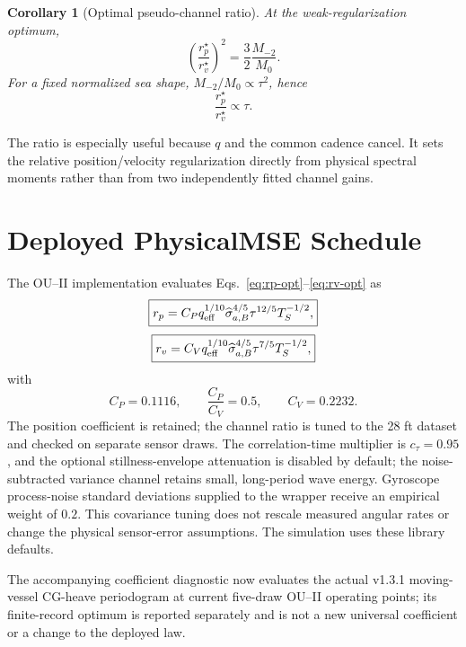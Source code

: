 \documentclass[conference]{IEEEtran}
\newtheorem{corollary}{Corollary}
\begin{document}
\begin{corollary}[Optimal pseudo-channel ratio]
At the weak-regularization optimum,
\begin{equation}
 \boxed{
 \left(\frac{r_p^\star}{r_v^\star}\right)^2
 =\frac{3}{2}\frac{M_{-2}}{M_0}.}
 \label{eq:ratio-exact}
\end{equation}
For a fixed normalized sea shape,
$M_{-2}/M_0\propto\tau^2$, hence
\begin{equation}
 \boxed{\frac{r_p^\star}{r_v^\star}\propto\tau.}
 \label{eq:ratio-tau}
\end{equation}
\end{corollary}

The ratio is especially useful because $q$ and the common cadence cancel. It
sets the relative position/velocity regularization directly from physical
spectral moments rather than from two independently fitted channel gains.

\section{Deployed PhysicalMSE Schedule}
\label{sec:deployed}

The OU--II implementation evaluates Eqs.~\eqref{eq:rp-opt}--\eqref{eq:rv-opt}
as
\begin{equation}
 \boxed{
 r_p=
 C_P q_{\rm eff}^{1/10}\widehat\sigma_{a,B}^{4/5}
 \tau^{12/5}T_S^{-1/2},}
 \label{eq:deployed-rp}
\end{equation}
\begin{equation}
 \boxed{
 r_v=
 C_V q_{\rm eff}^{1/10}\widehat\sigma_{a,B}^{4/5}
 \tau^{7/5}T_S^{-1/2},}
 \label{eq:deployed-rv}
\end{equation}
with
\begin{equation}
 C_P=0.1116,
 \qquad
 \frac{C_P}{C_V}=0.5,
 \qquad C_V=0.2232.
 \label{eq:deployed-constants}
\end{equation}
The position coefficient is retained; the channel ratio is tuned to the
28 ft dataset and checked on separate sensor draws.
The correlation-time multiplier is $c_\tau=0.95$, and the
optional stillness-envelope attenuation is disabled by default; the
noise-subtracted variance channel retains small, long-period wave energy. Gyroscope process-noise standard
 deviations supplied to the wrapper receive an empirical weight of $0.2$.
This covariance tuning does not rescale measured angular rates or change the
physical sensor-error assumptions. The simulation uses these library defaults.

The accompanying coefficient diagnostic now evaluates the actual v1.3.1 moving-vessel
CG-heave periodogram at current five-draw OU--II operating points; its
finite-record optimum is reported separately and is not a new universal
coefficient or a change to the deployed law.
\end{document}
